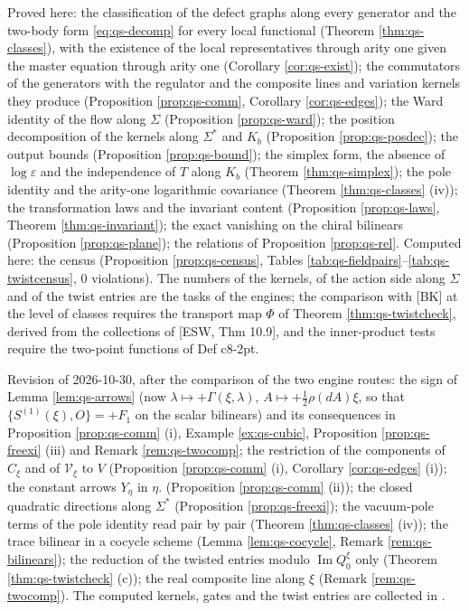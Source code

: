 \documentclass[11pt]{article}
\numberwithin{equation}{section}
\theoremstyle{plain}
\theoremstyle{definition}
\begin{document}
Proved here: the classification of the defect graphs along every generator and the two-body form \eqref{eq:qs-decomp} for every local functional (Theorem \ref{thm:qs-classes}), with the existence of the local representatives through arity one given the master equation through arity one (Corollary \ref{cor:qs-exist}); the commutators of the generators with the regulator and the composite lines and variation kernels they produce (Proposition \ref{prop:qs-comm}, Corollary \ref{cor:qs-edges}); the Ward identity of the flow along $\Sigma$ (Proposition \ref{prop:qs-ward}); the position decomposition of the kernels along $\Sigma^*$ and $K_b$ (Proposition \ref{prop:qs-posdec}); the output bounds (Proposition \ref{prop:qs-bound}); the simplex form, the absence of $\log\varepsilon$ and the independence of $T$ along $K_b$ (Theorem \ref{thm:qs-simplex}); the pole identity and the arity-one logarithmic covariance (Theorem \ref{thm:qs-classes} (iv)); the transformation laws and the invariant content (Proposition \ref{prop:qs-laws}, Theorem \ref{thm:qs-invariant}); the exact vanishing on the chiral bilinears (Proposition \ref{prop:qs-plane}); the relations of Proposition \ref{prop:qs-rel}. Computed here: the census (Proposition \ref{prop:qs-census}, Tables \ref{tab:qs-fieldpairs}--\ref{tab:qs-twistcensus}, $0$ violations). The numbers of the kernels, of the action side along $\Sigma$ and of the twist entries are the tasks of the engines; the comparison with [BK] at the level of classes requires the transport map $\Phi$ of Theorem \ref{thm:qs-twistcheck}, derived from the collections of [ESW, Thm 10.9], and the inner-product tests require the two-point functions of Def c8-2pt.

Revision of 2026-10-30, after the comparison of the two engine routes: the sign of Lemma \ref{lem:qs-arrows} (now $\lambda\mapsto+\Gamma(\xi,\lambda)$, $A\mapsto+\tfrac12\rho(dA)\xi$, so that $\{S^{(1)}(\xi),O\}=+F_1$ on the scalar bilinears) and its consequences in Proposition \ref{prop:qs-comm} (i), Example \ref{ex:qs-cubic}, Proposition \ref{prop:qs-freexi} (iii) and Remark \ref{rem:qs-twocomp}; the restriction of the components of $C_\xi$ and of $\mathcal V_\xi$ to $V$ (Proposition \ref{prop:qs-comm} (i), Corollary \ref{cor:qs-edges} (i)); the constant arrows $Y_\eta$ in $\eta.$ (Proposition \ref{prop:qs-comm} (ii)); the closed quadratic directions along $\Sigma^*$ (Proposition \ref{prop:qs-freexi}); the vacuum-pole terms of the pole identity read pair by pair (Theorem \ref{thm:qs-classes} (iv)); the trace bilinear in a cocycle scheme (Lemma \ref{lem:qs-cocycle}, Remark \ref{rem:qs-bilinears}); the reduction of the twisted entries modulo $\operatorname{Im}Q^\xi_0$ only (Theorem \ref{thm:qs-twistcheck} (c)); the real composite line along $\xi$ (Remark \ref{rem:qs-twocomp}). The computed kernels, gates and the twist entries are collected in .
\end{document}
